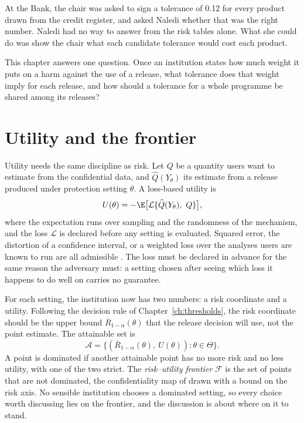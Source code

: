 At the Bank, the chair was asked to sign a tolerance of 0.12 for every product
drawn from the credit register, and asked Naledi whether that was the right number.
Naledi had no way to answer from the risk tables alone. What she could do was show
the chair what each candidate tolerance would cost each product.

This chapter answers one question. Once an institution states how much weight it
puts on a harm against the use of a release, what tolerance does that weight imply
for each release, and how should a tolerance for a whole programme be shared among
its releases?

\section{Utility and the frontier}\label{c08:sec-frontier}

Utility needs the same discipline as risk. Let $Q$ be a quantity users want to
estimate from the confidential data, and $\widehat{Q}(Y_\theta)$ its estimate from
a release produced under protection setting $\theta$. A loss-based utility is
\begin{equation}\label{c08:eq-util}
U(\theta) = -\E\big[\mathcal{L}\{\widehat{Q}(Y_\theta),\ Q\}\big],
\end{equation}
where the expectation runs over sampling and the randomness of the mechanism, and
the loss $\mathcal{L}$ is declared before any setting is evaluated. Squared error,
the distortion of a confidence interval, or a weighted loss over the analyses users
are known to run are all admissible \citep{karr2006,snoke2018}. The loss must be
declared in advance for the same reason the adversary must: a setting chosen after
seeing which loss it happens to do well on carries no guarantee.

For each setting, the institution now has two numbers: a risk coordinate and a
utility. Following the decision rule of Chapter~\ref{ch:thresholds}, the risk
coordinate should be the upper bound $\overline{R}_{1-\alpha}(\theta)$ that the
release decision will use, not the point estimate. The attainable set is
\[
\mathcal{A} = \{(\overline{R}_{1-\alpha}(\theta),\ U(\theta)) : \theta \in \Theta\} .
\]
A point is dominated if another attainable point has no more risk and no less
utility, with one of the two strict. The \emph{risk--utility frontier} $\mathcal{F}$
is the set of points that are not dominated, the confidentiality map of
\citet{duncan2001} drawn with a bound on the risk axis. No sensible institution
chooses a dominated setting, so every choice worth discussing lies on the frontier,
and the discussion is about where on it to stand.

